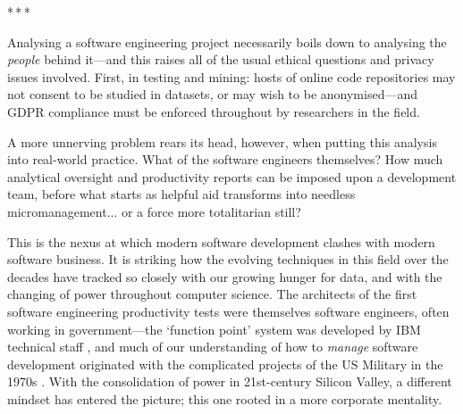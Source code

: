 \documentclass[12pt]{article}
\newcommand{\parbreak}{\bigskip\par\centerline{*\,*\,*}\medskip\par}
\begin{document}
	\parbreak
	
	Analysing a software engineering project necessarily boils down to analysing the \textit{people} behind it---and this raises all of the usual ethical questions and privacy issues involved. First, in testing and mining: hosts of online code repositories may not consent to be studied in datasets, or may wish to be anonymised---and GDPR compliance must be enforced throughout by research\-ers in the field.
	
	A more unnerving problem rears its head, however, when putting this analysis into real-world practice. What of the software engineers themselves? How much analytical oversight and productivity reports can be imposed upon a development team, before what starts as helpful aid transforms into needless micromanagement... or a force more totalitarian still?
	
	This is the nexus at which modern software development clashes with modern software business. It is striking how the evolving techniques in this field over the decades have tracked so closely with our growing hunger for data, and with the changing of power throughout computer science. The architects of the first software engineering productivity tests were themselves software engineers, often working in government---the `function point' system was developed by IBM technical staff \cite{stutzke}, and much of our understanding of how to \textit{manage} software development originated with the complicated projects of the US Military in the 1970s \cite{rand}. With the consolidation of power in 21st-century Silicon Valley, a different mindset has entered the picture; this one rooted in a more corporate mentality. 
	
	\begin{center}
		\hrulefill
	\end{center}
	
\end{document}
